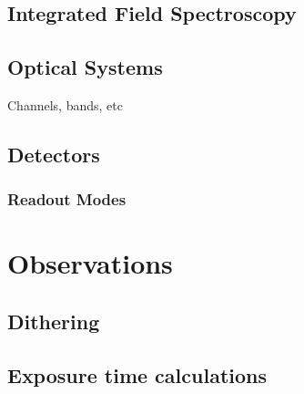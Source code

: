 \subsection{Integrated Field Spectroscopy}
\subsection{Optical Systems}
Channels, bands, etc \cite{ref:Chen2019}
\subsection{Detectors}
\subsubsection{Readout Modes}
\section{Observations}
\subsection{Dithering}
\subsection{Exposure time calculations}
